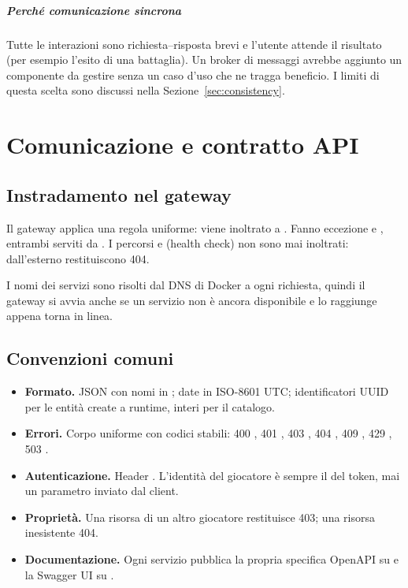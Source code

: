 \documentclass[11pt,a4paper]{report}
\begin{document}
\paragraph{Perché comunicazione sincrona}
Tutte le interazioni sono richiesta--risposta brevi e l'utente attende il risultato (per esempio l'esito di una battaglia). Un broker di messaggi avrebbe aggiunto un componente da gestire senza un caso d'uso che ne tragga beneficio. I limiti di questa scelta sono discussi nella Sezione~\ref{sec:consistency}.

\chapter{Comunicazione e contratto API}

\section{Instradamento nel gateway}

Il gateway applica una regola uniforme:  viene inoltrato a . Fanno eccezione  e , entrambi serviti da . I percorsi  e  (health check) non sono mai inoltrati: dall'esterno restituiscono 404.

I nomi dei servizi sono risolti dal DNS di Docker a ogni richiesta, quindi il gateway si avvia anche se un servizio non è ancora disponibile e lo raggiunge appena torna in linea.

\section{Convenzioni comuni}

\begin{itemize}
  \item \textbf{Formato.} JSON con nomi in ; date in ISO-8601 UTC; identificatori UUID per le entità create a runtime, interi per il catalogo.
  \item \textbf{Errori.} Corpo uniforme  con codici stabili: 400 , 401 , 403 , 404 , 409 , 429 , 503 .
  \item \textbf{Autenticazione.} Header . L'identità del giocatore è sempre il  del token, mai un parametro inviato dal client.
  \item \textbf{Proprietà.} Una risorsa di un altro giocatore restituisce 403; una risorsa inesistente 404.
  \item \textbf{Documentazione.} Ogni servizio pubblica la propria specifica OpenAPI su  e la Swagger UI su .
\end{itemize}
\end{document}
